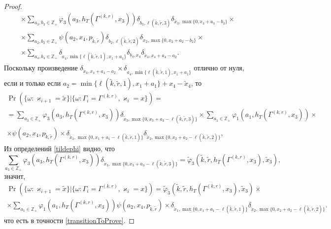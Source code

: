 \documentclass{report}
\begin{document}
\begin{proof}
\begin{multline*}
\times \sum_{a_3,b_3 \in \mathbb{Z}_+}  \varphi_3(a_3,h_T(\Gamma^{(k,r)},x_3)) \delta_{b_3,\ell(\tilde{k},\tilde{r},3)}  \delta_{\tilde{x}_3,\max{\{0,x_3+a_3-b_3\}}} \times \\
\times \sum_{a_2,b_2 \in \mathbb{Z}_+}  \psi(a_2,x_4, p_{\tilde{k},\tilde{r}})   \delta_{b_2,\ell(\tilde{k},\tilde{r},2)}   \delta_{\tilde{x}_2,\max{\{0,x_2+a_2-b_2\}}} \times \\
\times \sum_{a_4,b_4 \in \mathbb{Z}_+}  \delta_{a_4,\min{\{\ell(\tilde{k},\tilde{r},1), x_1+a_1}\}}   \delta_{b_4,x_4} \delta_{\tilde{x}_4,x_4+a_4-a_2}.
\end{multline*}
Поскольку произведение $\delta_{\tilde{x}_4,x_4+a_4-a_2}\times \delta_{a_4,\min{\{\ell(\tilde{k},\tilde{r},1), x_1+a_1}\}}$ отлично от нуля, если и только если $a_2 = \min{\{\ell(\tilde{k},\tilde{r},1), x_1+a_1}\} +x_4-\tilde{x}_4$, то
\begin{multline*}
\Pr (\{\omega\colon\varkappa_{i+1}=\tilde{x}\}|\{\omega\colon\Gamma_{i}=\Gamma^{(k,r)},\varkappa_i=x\})=\\=\sum_{a_3\in \mathbb{Z}_+}  \varphi_3(a_3,h_T(\Gamma^{(k,r)},x_3))  \delta_{\tilde{x}_3,\max{\{0,x_3+a_3-\ell(\tilde{k},\tilde{r},3)\}}} 
\times\sum_{a_1 \in \mathbb{Z}_+} \varphi_1(a_1,h_T(\Gamma^{(k,r)},x_3))  \times \\ \times \psi(a_2,x_4, p_{\tilde{k},\tilde{r}}) 
\times \delta_{\tilde{x}_1,\max{\{0,x_1+a_1-\ell(\tilde{k},\tilde{r},1)\}}}  \delta_{\tilde{x}_2,\max{\{0,x_2+a_2-\ell(\tilde{k},\tilde{r},2)\}}},
\end{multline*}
Из определений \eqref{tildephi} видно, что
\begin{equation*}
\sum_{a_3\in \mathbb{Z}_+}  \varphi_3(a_3,h_T(\Gamma^{(k,r)},x_3))  \delta_{\tilde{x}_3,\max{\{0,x_3+a_3-\ell(\tilde{k},\tilde{r},3)\}}} = \tilde{\varphi}_3(\tilde{k},\tilde{r},h_T(\Gamma^{(k,r)},x_3),\tilde{x}_3),
\end{equation*}
значит,
\begin{multline*}
\Pr (\{\omega\colon\varkappa_{i+1}=\tilde{x}\}|\{\omega\colon\Gamma_{i}=\Gamma^{(k,r)},\varkappa_i=x\})
=\tilde{\varphi}_3(\tilde{k},\tilde{r},h_T(\Gamma^{(k,r)},x_3),\tilde{x}_3) \times\\
\times \sum_{a_1 \in \mathbb{Z}_+} \varphi_1(a_1,h_T(\Gamma^{(k,r)},x_3))  \psi(a_2,x_4, p_{\tilde{k},\tilde{r}}) \times \delta_{\tilde{x}_1,\max{\{0,x_1+a_1-\ell(\tilde{k},\tilde{r},1)\}}}  \delta_{\tilde{x}_2,\max{\{0,x_2+a_2-\ell(\tilde{k},\tilde{r},2)\}}}.
\end{multline*}
что есть в точности \eqref{transitionToProve}.
\end{proof}
\end{document}

